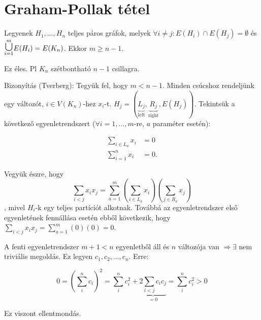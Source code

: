 \chapter{Graham-Pollak tétel}

\begin{thm}
  Legyenek $H_1, \dots, H_n$ teljes páros gráfok, melyek $\forall i \not = j: E(H_i) \cap E(H_j) = \emptyset$ és $\cuploop{m}{i=1} E(H_i) = E(K_n)$. Ekkor $m \geq n - 1$.
\end{thm}

\begin{obs}
  Ez éles. Pl $K_n$ szétbontható $n-1$ csillagra.
\end{obs}

Bizonyítás (Tverberg):
Tegyük fel, hogy $m < n-1$. Minden csúcshoz rendeljünk egy változót, $i \in V(K_n)$-hez $x_i$-t. $H_j = (\underbrace{L_j}_{\text{left}}, \underbrace{R_j}_{\text{right}}, E(H_j))$. Tekintsük a következő egyenletrendszert ($\forall i=1, \dots , m$-re, $a$ paraméter esetén):

\begin{align}
  \sum_{i \in L_a} x_i &= 0 \\
  \sum_{i = 1}^{n} x_i &= 0.
\end{align}

Vegyük észre, hogy $$\sum_{i < j} x_i x_j = \sum_{a=1}^m \left(\sum_{i \in L_a} x_i\right) \left(\sum_{j \in R_a} x_j\right)$$, mivel $H_i$-k egy teljes partíciót alkotnak. Továbbá az egyenletrendszer első egyenletének fennállása esetén ebből következik, hogy $\sum_{i < j} x_i x_j = \sum_{a=1}^m (0) (0) = 0$.

\medskip

A fenti egyenletrendszer $m+1 < n$ egyenletből áll és $n$ változója van $\Rightarrow \exists$ nem triviális megoldás. Ez legyen $c_1, c_2, \dots, c_n$. Erre:

\[0 = \left(\sum_i^n c_i \right)^2 = \sum_i^n c_i^2 + \underbrace{2\sum_{i < j} c_i c_j}_{=0} = \sum_i^n c_i^2 > 0\]

Ez viszont ellentmondás. \QED

